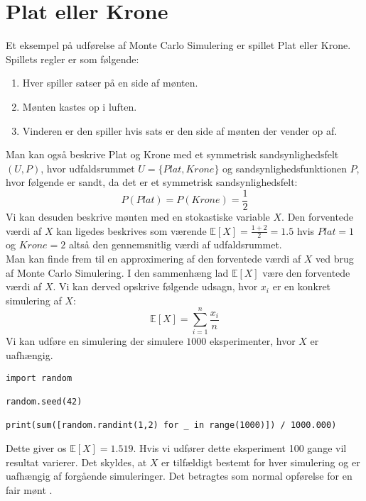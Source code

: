 \documentclass[../../SRP.tex]{subfiles}
\begin{document}
\section{Plat eller Krone}
Et eksempel på udførelse af Monte Carlo Simulering er spillet Plat eller Krone. Spillets regler er som følgende:
\begin{enumerate}
  \item Hver spiller satser på en side af mønten.

  \item Mønten kastes op i luften.

  \item Vinderen er den spiller hvis sats er den side af mønten der vender op af.
\end{enumerate}

Man kan også beskrive Plat og Krone med et symmetrisk sandsynlighedsfelt $(U, P)$, hvor udfaldsrummet $U = \{Plat, Krone\}$ og sandsynlighedsfunktionen $P$, hvor følgende er sandt, da det er et symmetrisk sandsynlighedsfelt:
\begin{equation}
  P(Plat) = P(Krone) = \frac{1}{2}
\end{equation}
Vi kan desuden beskrive mønten med en stokastiske variable $X$. Den forventede værdi af $X$ kan ligedes beskrives som værende $\mathbb{E}[X] = \frac{1 + 2}{2} = 1.5$ hvis $Plat = 1$ og $Krone = 2$ altså den gennemsnitlig værdi af udfaldsrummet. \\

Man kan finde frem til en approximering af den forventede værdi af $X$ ved brug af Monte Carlo Simulering. I den sammenhæng lad $\mathbb{E}[X]$ være den forventede værdi af $X$. Vi kan derved opskrive følgende udsagn, hvor $x_i$ er en konkret simulering af $X$:
\begin{equation}
  \mathbb{E}[X] = \sum\limits_{i=1}^n\frac{x_i}{n}
\end{equation}
Vi kan udføre en simulering der simulere $1000$ eksperimenter, hvor $X$ er uafhængig.
\begin{lstlisting}
import random

random.seed(42)

print(sum([random.randint(1,2) for _ in range(1000)]) / 1000.000)
\end{lstlisting}
Dette giver os $\mathbb{E}[X] = 1.519$. Hvis vi udfører dette eksperiment 100 gange vil resultat varierer. Det skyldes, at $X$ er tilfældigt bestemt for hver simulering og er uafhængig af forgående simuleringer. Det betragtes som normal opførelse for en fair mønt \cite{NM}. \\
\end{document}

